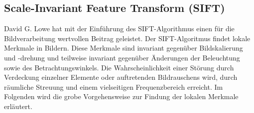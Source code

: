 \subsection{Scale-Invariant Feature Transform (SIFT)}
David G. Lowe hat mit der Einführung des SIFT-Algorithmus einen für die
Bildverarbeitung wertvollen Beitrag geleistet. Der SIFT-Algoritmus findet lokale
Merkmale in Bildern. Diese Merkmale sind invariant gegenüber Bildskalierung und
-drehung und teilweise invariant gegenüber Änderungen der Beleuchtung sowie des
Betrachtungswinkels. Die Wahrscheinlichkeit einer Störung durch Verdeckung
einzelner Elemente oder auftretenden Bildrauschens wird, durch räumliche
Streuung und einem vielseitigen Frequenzbereich erreicht. Im Folgenden wird die
grobe Vorgehensweise zur Findung der lokalen Merkmale erläutert.
\parencite{sift-distinctive-features}

